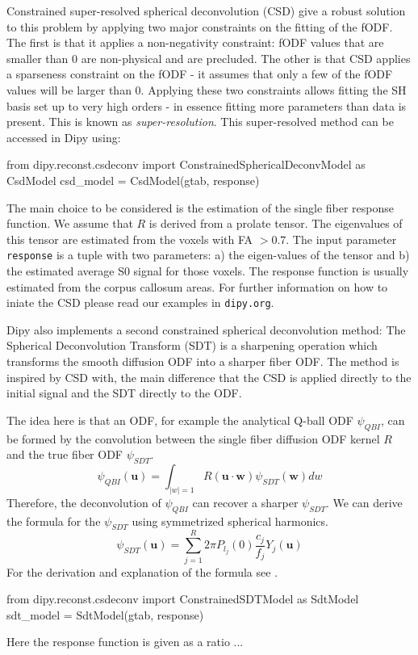 \documentclass{bioinfo}
\begin{document}
Constrained super-resolved spherical deconvolution (CSD) \citep{tournier-calamante-etal:07} give a robust solution to this problem by applying two major constraints on the fitting of the fODF. The first is that it applies a non-negativity constraint: fODF values that are smaller than 0 are non-physical and are precluded. The other is that CSD applies a sparseness constraint on the fODF - it assumes that only a few of the fODF values will be larger than 0. Applying these two constraints allows fitting the SH basis set up to very high orders - in essence fitting more parameters than data is present. This is known as \emph{super-resolution}. This super-resolved method can be accessed in Dipy using:
\begin{python}
from dipy.reconst.csdeconv import
        ConstrainedSphericalDeconvModel as CsdModel
csd_model = CsdModel(gtab, response)
\end{python}
The main choice to be considered is the estimation of the single fiber response function.  We assume that $R$ is derived from a prolate tensor. The eigenvalues of this tensor are estimated from the voxels with FA $> 0.7$. The input parameter \texttt{response} is a tuple with two parameters: a) the eigen-values of the tensor and b) the estimated average S0 signal for those voxels. The response function is usually estimated from the corpus callosum areas. For further information on how to iniate the CSD please read our examples in \texttt{dipy.org}.

Dipy also implements a second constrained spherical deconvolution method: The Spherical Deconvolution Transform (SDT) is a sharpening operation which transforms the smooth diffusion ODF into a sharper fiber ODF. The method is inspired by CSD \cite{tournier-calamante-etal:07} with, the main difference that the CSD is applied directly to the initial signal and the SDT directly to the ODF.

The idea here is that an ODF, for example the analytical Q-ball ODF $\psi_{QBI}$, can be formed by the convolution between the single fiber diffusion ODF kernel $R$ and the true fiber ODF $\psi_{SDT}$.
\begin{equation}
\psi_{QBI}(\mathbf{u})=\displaystyle\int_{|w|=1} R(\mathbf{u} \cdot \mathbf{w}) \psi_{SDT}(\mathbf{w}) dw\label{eq:Conv}
\end{equation}
Therefore, the deconvolution of $\psi_{QBI}$ can recover a sharper $\psi_{SDT}$. We can derive the formula for the $\psi_{SDT}$ using symmetrized spherical harmonics.
\begin{equation}
\psi_{SDT}(\mathbf{u})=\displaystyle\sum_{j=1}^{R}2\pi P_{l_{j}}(0) \frac{c_j}{f_j}Y_{j}(\mathbf{u})\label{eq:ODF_SDT}
\end{equation}
For the derivation and explanation of the formula see \citep{descoteaux-deriche-etal:09}.
\begin{python}
from dipy.reconst.csdeconv import
        ConstrainedSDTModel as SdtModel
sdt_model = SdtModel(gtab, response)
\end{python}
Here the response function is given as a ratio ...
\end{document}
